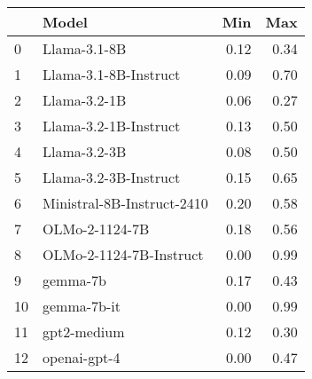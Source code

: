 \begin{tabular}{llrr}
\toprule
 & Model & Min & Max \\
\midrule
0 & Llama-3.1-8B & 0.12 & 0.34 \\
1 & Llama-3.1-8B-Instruct & 0.09 & 0.70 \\
2 & Llama-3.2-1B & 0.06 & 0.27 \\
3 & Llama-3.2-1B-Instruct & 0.13 & 0.50 \\
4 & Llama-3.2-3B & 0.08 & 0.50 \\
5 & Llama-3.2-3B-Instruct & 0.15 & 0.65 \\
6 & Ministral-8B-Instruct-2410 & 0.20 & 0.58 \\
7 & OLMo-2-1124-7B & 0.18 & 0.56 \\
8 & OLMo-2-1124-7B-Instruct & 0.00 & 0.99 \\
9 & gemma-7b & 0.17 & 0.43 \\
10 & gemma-7b-it & 0.00 & 0.99 \\
11 & gpt2-medium & 0.12 & 0.30 \\
12 & openai-gpt-4 & 0.00 & 0.47 \\
\bottomrule
\end{tabular}
